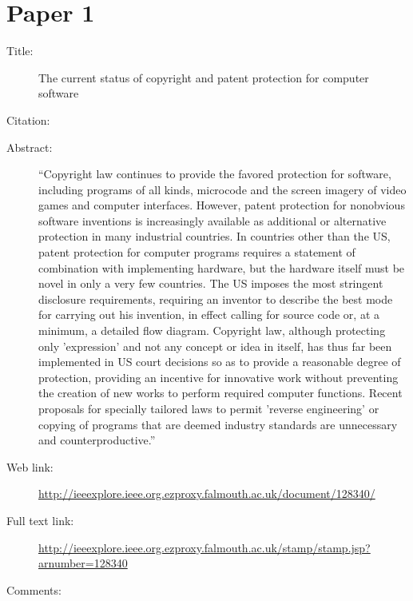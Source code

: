 \documentclass{scrartcl}
\begin{document}
\section*{Paper 1}
\begin{description}
\item[Title:] The current status of copyright and patent protection for computer software
\item[Citation:] \cite{Current}
\item[Abstract:] ``Copyright law continues to provide the favored protection for software, including programs of all kinds, microcode and the screen imagery of video games and computer interfaces. However, patent protection for nonobvious software inventions is increasingly available as additional or alternative protection in many industrial countries. In countries other than the US, patent protection for computer programs requires a statement of combination with implementing hardware, but the hardware itself must be novel in only a very few countries. The US imposes the most stringent disclosure requirements, requiring an inventor to describe the best mode for carrying out his invention, in effect calling for source code or, at a minimum, a detailed flow diagram. Copyright law, although protecting only 'expression' and not any concept or idea in itself, has thus far been implemented in US court decisions so as to provide a reasonable degree of protection, providing an incentive for innovative work without preventing the creation of new works to perform required computer functions. Recent proposals for specially tailored laws to permit 'reverse engineering' or copying of programs that are deemed industry standards are unnecessary and counterproductive.''
\item[Web link:] \url{http://ieeexplore.ieee.org.ezproxy.falmouth.ac.uk/document/128340/}
\item[Full text link:] \url{http://ieeexplore.ieee.org.ezproxy.falmouth.ac.uk/stamp/stamp.jsp?arnumber=128340}
\item[Comments:] 
\end{description}
\end{document}
